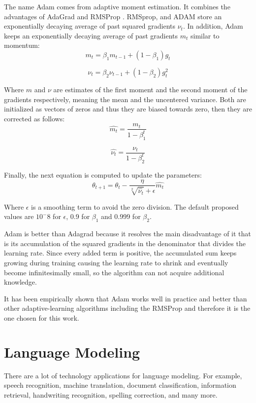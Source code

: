  
The name Adam comes from adaptive moment estimation. It combines the advantages of AdaGrad and RMSProp \cite{kingma2014adam}. RMSprop, and ADAM  store an exponentially decaying average of past squared gradients $\nu_t$. In addition, Adam keeps an exponentially decaying average of past gradients $m_t$ similar to momentum:
\begin{equation}
m_t=\beta_1 m_{t-1} + (1-\beta_1)g_t
\end{equation}

\begin{equation}
\nu_t=\beta_2 \nu_{t-1} + (1-\beta_2)g^2_t
\end{equation}

 Where $m$ and $\nu$ are estimates of the first moment and the second moment of the gradients respectively, meaning the mean and the uncentered variance. Both are initialized as vectors of zeros and thus they are biased towards zero, then they are corrected as follows:
\begin{equation}
\hat{m_t}=\frac{m_t}{1-\beta^t_1}
\end{equation}

\begin{equation}
\hat{\nu_t}=\frac{\nu_t}{1-\beta^t_2}
\end{equation}

Finally, the next equation is computed to update the parameters:
\begin{equation}
\theta_{t+1}=\theta_t-\frac{\eta}{\sqrt[2]{\hat{\nu_t}} + \epsilon} \hat{m_t} 
\end{equation}

Where $\epsilon$ is a smoothing term to avoid the zero division. The default proposed values are $10^-8$ for $\epsilon$, 0.9 for $\beta_1$ and 0.999 for $\beta_2$.

Adam is better than Adagrad because it resolves the main disadvantage of it that is its accumulation of the squared gradients in the denominator that divides the learning rate\cite{duchi2011adaptive}. Since every added term is positive, the accumulated sum keeps growing during training causing the learning rate to shrink and eventually become infinitesimally small, so the algorithm can not acquire additional knowledge\cite{ruder2016overview}. 

It has been empirically shown that Adam works well in practice and better than other adaptive-learning algorithms including the RMSProp and therefore it is the one chosen for this work.

\section{Language Modeling}
There are a lot of technology applications for language modeling. For example, speech recognition, machine translation, document classification, information retrieval, handwriting recognition, spelling correction, and many more.

